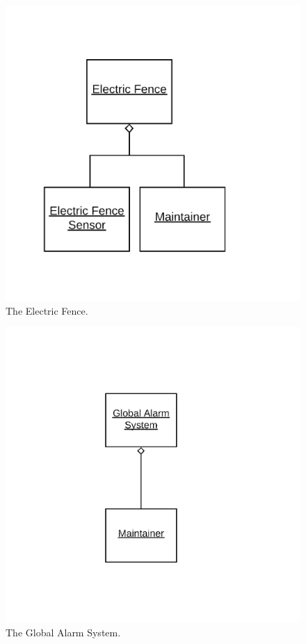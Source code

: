 \documentclass[12pt]{article}
\begin{document}
\begin{figure}[H]
    \centerline{\includegraphics[scale=.20]{ElectricFence.png}}
    \caption{The Electric Fence.}
    \label{fig:ElectricFence}
\end{figure}    

\begin{figure}[H]
    \centerline{\includegraphics[scale=.20]{GlobalAlarm.png}}
    \caption{The Global Alarm System.}
    \label{fig:GlobalAlarm}
\end{figure}  
\end{document}

